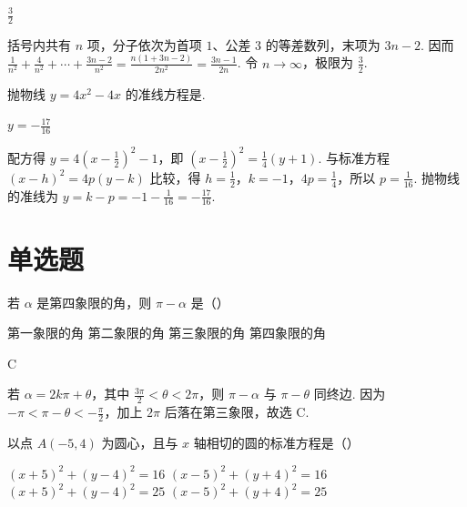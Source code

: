 \documentclass[UTF8,a4paper,oneside,11pt]{ctexbook}
\begin{document}
\begin{answer}
\(\frac{3}{2}\)
\end{answer}

\begin{solution}
括号内共有 \(n\) 项，分子依次为首项 \(1\)、公差 \(3\) 的等差数列，末项为 \(3n-2\). 因而 \(\frac{1}{n^2}+\frac{4}{n^2}+\cdots+\frac{3n-2}{n^2}=\frac{n\left(1+3n-2\right)}{2n^2}=\frac{3n-1}{2n}\). 令 \(n\to\infty\)，极限为 \(\frac{3}{2}\).
\end{solution}

\begin{problem}
抛物线 \(y=4x^2-4x\) 的准线方程是\fillinblank{}.
\end{problem}

\begin{answer}
\(y=-\frac{17}{16}\)
\end{answer}

\begin{solution}
配方得 \(y=4\left(x-\frac{1}{2}\right)^2-1\)，即 \(\left(x-\frac{1}{2}\right)^2=\frac{1}{4}(y+1)\). 与标准方程 \((x-h)^2=4p(y-k)\) 比较，得 \(h=\frac{1}{2}\)，\(k=-1\)，\(4p=\frac{1}{4}\)，所以 \(p=\frac{1}{16}\). 抛物线的准线为 \(y=k-p=-1-\frac{1}{16}=-\frac{17}{16}\).
\end{solution}

\section{单选题}

\begin{problem}
若 \(\alpha\) 是第四象限的角，则 \(\pi-\alpha\) 是（\quad）

\choices
    {第一象限的角}
    {第二象限的角}
    {第三象限的角}
    {第四象限的角}
\end{problem}

\begin{answer}
C
\end{answer}

\begin{solution}
若 \(\alpha=2k\pi+\theta\)，其中 \(\frac{3\pi}{2}<\theta<2\pi\)，则 \(\pi-\alpha\) 与 \(\pi-\theta\) 同终边. 因为 \(-\pi<\pi-\theta<-\frac{\pi}{2}\)，加上 \(2\pi\) 后落在第三象限，故选 C.
\end{solution}

\begin{problem}
以点 \(A(-5,4)\) 为圆心，且与 \(x\) 轴相切的圆的标准方程是（\quad）

\choices
    {\((x+5)^2+(y-4)^2=16\)}
    {\((x-5)^2+(y+4)^2=16\)}
    {\((x+5)^2+(y-4)^2=25\)}
    {\((x-5)^2+(y+4)^2=25\)}
\end{problem}
\end{document}
